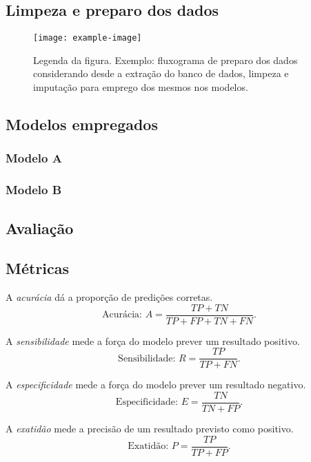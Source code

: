 \documentclass[9pt, a4paper, twocolumn]{article}
\begin{document}
\subsection{Limpeza e preparo dos dados}

\lipsum[8]

\begin{figure}[H]
  \centering
  \texttt{[image: example-image]}
  \caption{Legenda da figura. Exemplo: fluxograma de preparo dos dados
    considerando desde a extração do banco de dados, limpeza e imputação
    para emprego dos mesmos nos modelos.}
  \label{fig_01}
\end{figure}

\subsection{Modelos empregados}

\lipsum[9]

\subsubsection{Modelo A}

\lipsum[10]

\subsubsection{Modelo B}

\lipsum[11]

\subsection{Avaliação}

\lipsum[12]

\subsection{Métricas}

A \emph{acurácia} dá a proporção de predições corretas.
$$
\text{Acurácia: } A = \frac{TP + TN}{TP + FP + TN + FN}.
$$

A \emph{sensibilidade} mede a força do modelo prever um resultado
positivo.
$$
\text{Sensibilidade: } R = \frac{TP}{TP + FN}.
$$

A \emph{especificidade} mede a força do modelo prever um resultado
negativo.
$$
\text{Especificidade: } E = \frac{TN}{TN + FP}.
$$

A \emph{exatidão} mede a precisão de um resultado previsto como
positivo.
$$
\text{Exatidão: } P = \frac{TP}{TP + FP}.
$$
\end{document}
